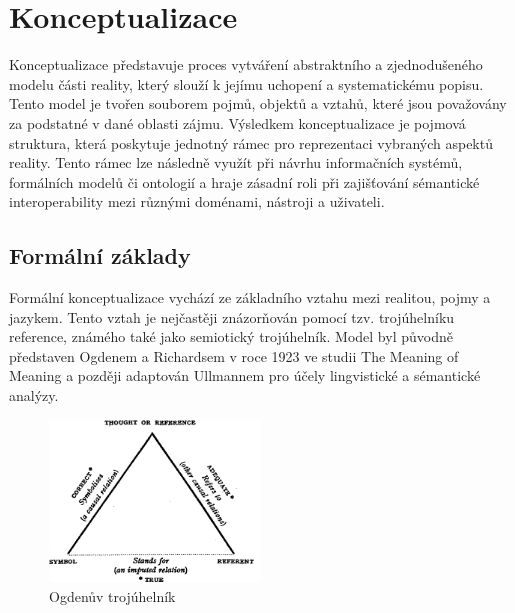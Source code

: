 
\section{Konceptualizace}
\label{sec:konceptualizace}
Konceptualizace představuje proces vytváření abstraktního a zjednodušeného modelu části reality, který slouží k jejímu uchopení a systematickému popisu. Tento model je tvořen souborem pojmů, objektů a vztahů, které jsou považovány za podstatné v dané oblasti zájmu. \cite{Pergl2018} Výsledkem konceptualizace je pojmová struktura, která poskytuje jednotný rámec pro reprezentaci vybraných aspektů reality. \cite{Hoppenbrouwers2005} Tento rámec lze následně využít při návrhu informačních systémů, formálních modelů či ontologií a hraje zásadní roli při zajišťování sémantické interoperability mezi různými doménami, nástroji a uživateli. \cite{Pergl2018,Bittner2006}


\subsection{Formální základy}
\label{sec:formální-základy}
Formální konceptualizace vychází ze základního vztahu mezi realitou, pojmy a jazykem. Tento vztah je nejčastěji znázorňován pomocí tzv. trojúhelníku reference, známého také jako semiotický trojúhelník. Model byl původně představen Ogdenem a Richardsem v roce 1923 ve studii The Meaning of Meaning a později adaptován Ullmannem pro účely lingvistické a sémantické analýzy. \cite{Pergl2018,Ogden1923,Ullmann1964}

\begin{figure}[H]
  \centering
  \includegraphics[width=0.5\textwidth]{images/ogden_triangle.png}
  \caption{Ogdenův trojúhelník \cite{Ogden1923}}
  \label{fig:ogden_triangle}
\end{figure}


